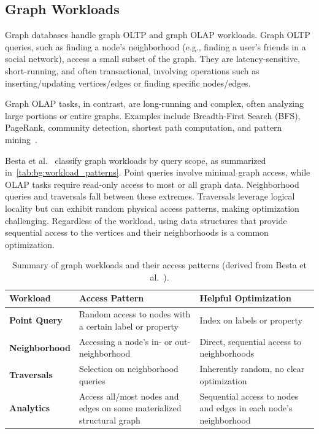\subsection{Graph Workloads}
\label{sec:bg:workloads}
Graph databases handle graph OLTP and graph OLAP workloads.
Graph OLTP queries, such as finding a node's neighborhood (e.g., finding a user’s friends in a social network), access a small subset of the graph.
They are latency-sensitive, short-running, and often transactional, involving operations such as inserting/updating vertices/edges or finding specific nodes/edges.

Graph OLAP tasks, in contrast, are long-running and complex, often analyzing large portions or entire graphs. Examples include Breadth-First Search (BFS), PageRank, community detection, shortest path computation, and pattern mining~\cite{capotua2015graphalytics}.

Besta et al.~\cite[Section 4.2.1]{besta2020demystifying} classify graph workloads by query scope, as summarized in~\autoref{tab:bg:workload_patterns}.
Point queries involve minimal graph access, while OLAP tasks require read-only access to most or all graph data. Neighborhood queries and traversals fall between these extremes. Traversals leverage logical locality but can exhibit random physical access patterns, making optimization challenging.
Regardless of the workload, using data structures that provide sequential access to the vertices and their neighborhoods is a common optimization.

\begin{table}[h!]
  \centering
  \footnotesize
  \begin{tabularx}{\columnwidth}{|l|X|X|}
  \hline
  \textbf{Workload} & \textbf{Access Pattern} & \textbf{Helpful Optimization} \\ \hline
  \textbf{Point Query} & 
    Random access to nodes with a certain label or property & 
    Index on labels or property \\ \hline
  \textbf{Neighborhood} & 
    Accessing a node's in- or out-neighborhood & 
    Direct, sequential access to neighborhoods \\ \hline
  \textbf{Traversals} & 
    Selection on neighborhood queries & 
    Inherently random, no clear optimization \\ \hline
  \textbf{Analytics} & 
    Access all/most nodes and edges on some materialized structural graph & 
    Sequential access to nodes and edges in each node's neighborhood \\ \hline
  \end{tabularx}
  \caption{Summary of graph workloads and their access patterns (derived from Besta et al.~\cite{besta2020demystifying}).}
  \label{tab:bg:workload_patterns}
\end{table}

